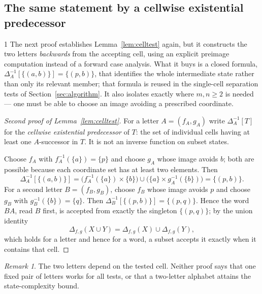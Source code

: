 \documentclass[11pt,letterpaper]{article}
\numberwithin{equation}{section}
\theoremstyle{definition}
\theoremstyle{remark}
\newtheorem{remark}[theorem]{Remark}
\begin{document}
\subsection{The same statement by a cellwise existential predecessor}
\begin{variantbox}{1}
The next proof establishes Lemma~\ref{lem:celltest} again, but it constructs
the two letters \emph{backwards} from the accepting cell, using an explicit
preimage computation instead of a forward case analysis. What it buys is a
closed formula, $\Delta_A^{-1}[\{(a,b)\}]=\{(p,b)\}$, that identifies the
whole intermediate state rather than only its relevant member; that formula
is reused in the single-cell separation tests of
Section~\ref{sec:algorithm}. It also isolates exactly where $m,n\ge2$ is
needed --- one must be able to choose an image avoiding a prescribed
coordinate.
\end{variantbox}

\begin{proof}[Second proof of Lemma~\ref{lem:celltest}]
For a letter $A=(f_A,g_A)$ write $\Delta_A^{-1}[T]$ for the
\emph{cellwise existential predecessor} of $T$: the set of individual cells
having at least one $A$-successor in $T$. It is not an inverse function on
subset states.

Choose $f_A$ with $f_A^{-1}(\{a\})=\{p\}$ and choose $g_A$ whose image avoids
$b$; both are possible because each coordinate set has at least two elements.
Then
\[
 \Delta_A^{-1}[\{(a,b)\}]
 =\bigl(f_A^{-1}(\{a\})\times\{b\}\bigr)
  \cup\bigl(\{a\}\times g_A^{-1}(\{b\})\bigr)
 =\{(p,b)\}.
\]
For a second letter $B=(f_B,g_B)$, choose $f_B$ whose image avoids $p$ and
choose $g_B$ with $g_B^{-1}(\{b\})=\{q\}$. Then
$\Delta_B^{-1}[\{(p,b)\}]=\{(p,q)\}$. Hence the word $BA$, read $B$ first, is
accepted from exactly the singleton $\{(p,q)\}$; by the union identity
\begin{equation}\label{eq:union}
 \Delta_{f,g}(X\cup Y)=\Delta_{f,g}(X)\cup\Delta_{f,g}(Y),
\end{equation}
which holds for a letter and hence for a word, a
subset accepts it exactly when it contains that cell.
\end{proof}

\begin{remark}
The two letters depend on the tested cell. Neither proof says that one fixed
pair of letters works for all tests, or that a two-letter alphabet attains
the state-complexity bound.
\end{remark}
\end{document}
